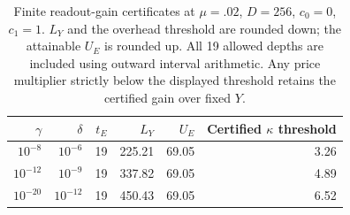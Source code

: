 \begin{table}[htbp]
\centering\small
\begin{tabular}{rrrrrr}
\toprule
$\gamma$ & $\delta$ & $t_E$ & $L_Y$ & $U_E$ & Certified $\kappa$ threshold\\
\midrule
$10^{-8}$ & $10^{-6}$ & 19 & 225.21 & 69.05 & 3.26\\
$10^{-12}$ & $10^{-9}$ & 19 & 337.82 & 69.05 & 4.89\\
$10^{-20}$ & $10^{-12}$ & 19 & 450.43 & 69.05 & 6.52\\
\bottomrule\end{tabular}
\caption{Finite readout-gain certificates at $\mu=.02$, $D=256$, $c_0=0$, $c_1=1$.
$L_Y$ and the overhead threshold are rounded down; the attainable $U_E$ is rounded up.
All 19 allowed depths are included using outward interval arithmetic.
Any price multiplier strictly below the displayed threshold retains the certified gain over fixed $Y$.}
\label{tab:deep-gains}
\end{table}
